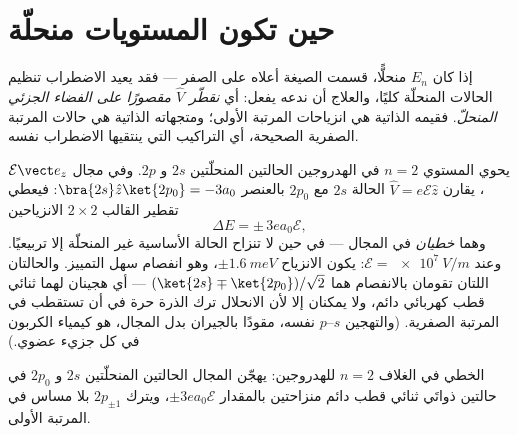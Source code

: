 \section{حين تكون المستويات منحلّة}

\begin{theorem}\label{thm:b3:perturbation-theory:degenerate}
إذا كان $E_n$ منحلًّا، قسمت الصيغة أعلاه على الصفر --- فقد
يعيد الاضطراب تنظيم الحالات المنحلّة كليًا،
والعلاج أن ندعه يفعل: أي \emph{نقطّر $\hat V$ مقصورًا على
الفضاء الجزئي المنحلّ}. فقيمه الذاتية هي انزياحات المرتبة الأولى؛
ومتجهاته الذاتية هي حالات المرتبة الصفرية الصحيحة، أي
التراكيب التي ينتقيها الاضطراب نفسه.
\end{theorem}
\admitted

\begin{example}\label{ex:b3:perturbation-theory:stark}
يحوي المستوي $n = 2$ في الهدروجين الحالتين المنحلّتين $2s$ و $2p$.
وفي مجال $\mathcal E\vect e_z$، يقارن $\hat V = e\mathcal E\hat z$
الحالة $2s$ مع $2p_0$ بالعنصر $\bra{2s}\hat z\ket{2p_0} = -3a_0$:
فيعطي تقطير القالب $2\times2$ الانزياحين
\[
\Delta E = \pm\,3e a_0\mathcal E ,
\]
وهما \emph{خطيان} في المجال --- في حين لا تنزاح الحالة الأساسية غير
المنحلّة إلا تربيعيًا. وعند $\mathcal E = \qty{e7}{V/m}$: يكون الانزياح $\pm
\qty{1.6}{meV}$، وهو انفصام سهل التمييز. والحالتان اللتان تقومان
بالانفصام هما $(\ket{2s} \mp \ket{2p_0})/\sqrt2$ --- أي هجينان لهما
ثنائي قطب كهربائي دائم، ولا يمكنان إلا لأن الانحلال ترك
الذرة حرة في أن تستقطب في المرتبة الصفرية. (والتهجين $s$--$p$
نفسه، مقودًا بالجيران بدل المجال، هو كيمياء الكربون في كل
جزيء عضوي.)
\end{example}

\begin{omfigure}

{\small {} الخطي في الغلاف $n = 2$ للهدروجين: يهجّن
المجال الحالتين المنحلّتين $2s$ و $2p_0$ في حالتين ذواتَي
ثنائي قطب دائم منزاحتين بالمقدار $\pm3ea_0\mathcal E$، ويترك
$2p_{\pm1}$ بلا مساس في المرتبة الأولى.}
\end{omfigure}

